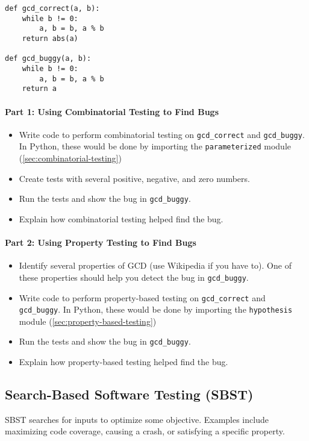\documentclass[oneside,11pt,dvipsnames]{book}
\newcommand{\code}[1]{\texttt{#1}}
\begin{document}
\begin{lstlisting}[multicols=2]
def gcd_correct(a, b):
    while b != 0:
        a, b = b, a % b
    return abs(a)

def gcd_buggy(a, b):
    while b != 0:
        a, b = b, a % b
    return a
\end{lstlisting}

\paragraph{Part 1: Using Combinatorial Testing to Find Bugs}
\begin{itemize} 
    \item Write code to perform combinatorial testing on \code{gcd\_correct} and \code{gcd\_buggy}. In Python, these would be done by importing the \code{parameterized} module (\autoref{sec:combinatorial-testing})
    \item Create tests with several positive, negative, and zero numbers.
    \item Run the tests and show the bug in \code{gcd\_buggy}.  
    \item Explain how combinatorial testing helped find the bug.
\end{itemize}

\paragraph{Part 2: Using Property Testing to Find Bugs}
\begin{itemize}
\item Identify several properties of GCD (use Wikipedia if you have to). One of these properties should help you detect the bug in \code{gcd\_buggy}.
\item Write code to perform property-based testing on \code{gcd\_correct} and \code{gcd\_buggy}. In Python, these would be done by importing the \code{hypothesis} module (\autoref{sec:property-based-testing})
\item Run the tests and show the bug in \code{gcd\_buggy}.
\item Explain how property-based testing helped find the bug.
\end{itemize}


\subsection{Search-Based Software Testing (SBST)}
SBST searches for inputs to optimize some objective. Examples include maximizing code coverage, causing a crash, or satisfying a specific property.
\end{document}
